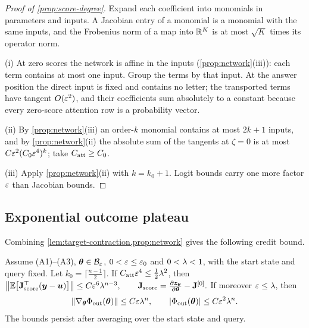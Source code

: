\begin{proof}[Proof of \cref{prop:score-degree}]
Expand each coefficient into monomials in parameters and inputs. A Jacobian entry of a monomial is a monomial with the same inputs, and the
Frobenius norm of a map into $\mathbb R^K$ is at most $\sqrt K$ times its operator norm.

\noindent(i) At zero scores the network is affine in the inputs (\cref{prop:network}(iii)): each term contains at most one input. Group the terms by
that input. At the answer position the direct input is fixed and contains no letter; the transported terms have tangent $O(\varepsilon^2)$, and
their coefficients sum absolutely to a constant because every zero-score attention row is a probability vector.

\noindent(ii) By \cref{prop:network}(iii) an order-$k$ monomial contains at most $2k+1$ inputs, and by \cref{prop:network}(ii) the absolute sum of the
tangents at $\zeta=0$ is at most $C\varepsilon^2(C_0\varepsilon^4)^k$; take $C_{\mathrm{att}}\ge C_0$.

\noindent(iii) Apply \cref{prop:network}(ii) with $k=k_0+1$. Logit bounds carry one more factor $\varepsilon$ than Jacobian bounds.
\end{proof}

\subsection{Exponential outcome plateau}
\label{app:thm1}

Combining \cref{lem:target-contraction,prop:network} gives the following credit bound.

\begin{lemma}
\label{lem:score-sum}
Assume (A1)--(A3), $\bm\theta\in\mathcal B_{\varepsilon}$, $0<\varepsilon\le\varepsilon_0$ and $0<\lambda<1$, with the start state and query fixed. Let
$k_0=\lceil\frac{n-1}{2}\rceil$. If $C_{\mathrm{att}}\varepsilon^4\le\frac{1}{2}\lambda^2$, then
 $\bigl\|\E\bigl[\mathbf J_{\mathrm{score}}^\top(\bm y-\bm u)\bigr]\bigr\|\le C\initscale^6\mixrate^{n-3},\qquad \mathbf J_{\mathrm{score}}=\Jz-\mathbf J^{[0]}.$ 
If moreover $\varepsilon\le\lambda$, then
\begin{equation}
 \|\nabla_{\bm\theta}\Phi_{\mathrm{out}}(\bm\theta)\|\le C\varepsilon\lambda^n,\qquad |\Phi_{\mathrm{out}}(\bm\theta)|\le C\varepsilon^2\lambda^n.
 \label{eq:thm1-full}
\end{equation}
The bounds persist after averaging over the start state and query.
\end{lemma}


